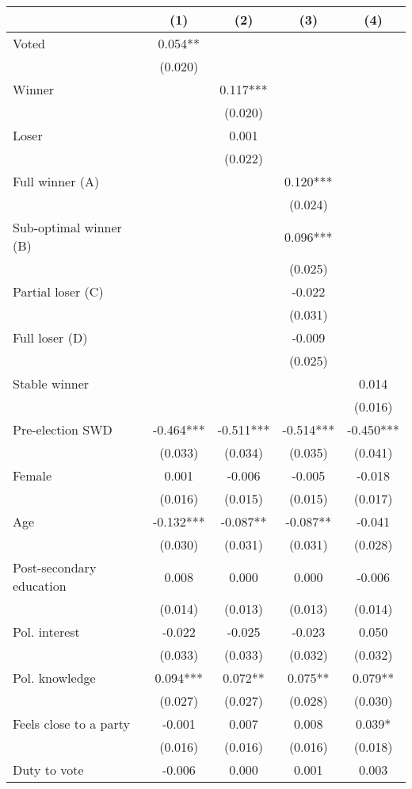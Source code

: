 \begin{table}
\centering
\begin{tabular}[t]{lcccc}
\toprule
  & (1) & (2) & (3) & (4)\\
\midrule
Voted & 0.054** &  &  & \\
 & (0.020) &  &  & \\
Winner &  & 0.117*** &  & \\
 &  & (0.020) &  & \\
Loser &  & 0.001 &  & \\
 &  & (0.022) &  & \\
Full winner (A) &  &  & 0.120*** & \\
 &  &  & (0.024) & \\
Sub-optimal winner (B) &  &  & 0.096*** & \\
 &  &  & (0.025) \vphantom{1} & \\
Partial loser (C) &  &  & -0.022 & \\
 &  &  & (0.031) & \\
Full loser (D) &  &  & -0.009 & \\
 &  &  & (0.025) & \\
Stable winner &  &  &  & 0.014\\
 &  &  &  & (0.016)\\
Pre-election SWD & -0.464*** & -0.511*** & -0.514*** & -0.450***\\
 & (0.033) & (0.034) & (0.035) & (0.041)\\
Female & 0.001 & -0.006 & -0.005 & -0.018\\
 & (0.016) & (0.015) & (0.015) & (0.017)\\
Age & -0.132*** & -0.087** & -0.087** & -0.041\\
 & (0.030) & (0.031) & (0.031) & (0.028)\\
Post-secondary education & 0.008 & 0.000 & 0.000 & -0.006\\
 & (0.014) & (0.013) & (0.013) & (0.014)\\
Pol. interest & -0.022 & -0.025 & -0.023 & 0.050\\
 & (0.033) & (0.033) & (0.032) & (0.032)\\
Pol. knowledge & 0.094*** & 0.072** & 0.075** & 0.079**\\
 & (0.027) & (0.027) & (0.028) & (0.030)\\
Feels close to a party & -0.001 & 0.007 & 0.008 & 0.039*\\
 & (0.016) & (0.016) & (0.016) & (0.018)\\
Duty to vote & -0.006 & 0.000 & 0.001 & 0.003\\

\end{tabular}
\end{table}
